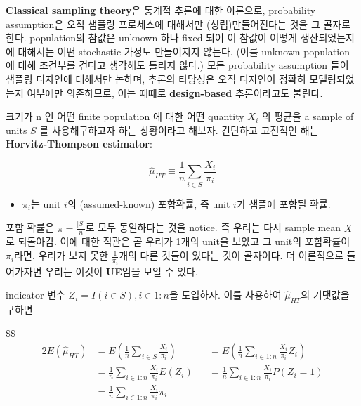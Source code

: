 \documentclass[
]{book}
\providecommand{\tightlist}{%
  \setlength{\itemsep}{0pt}\setlength{\parskip}{0pt}}
\begin{document}
{{{\textbf{Classical sampling theory}은 통계적 추론에 대한 이론으로, probability assumption은 오직 샘플링 프로세스에 대해서만 (성립)만들어진다는 것을 그 골자로 한다. population의 참값은 unknown 하나 fixed 되어 이 참값이 어떻게 생산되었는지에 대해서는 어떤 stochastic 가정도 만들어지지 않는다. (이를 unknown population 에 대해 조건부를 건다고 생각해도 틀리지 않다.) 모든 probability assumption 들이 샘플링 디자인에 대해서만 논하며, 추론의 타당성은 오직 디자인이 정확히 모델링되었는지 여부에만 의존하므로, 이는 때때로 \textbf{design-based} 추론이라고도 불린다.

크기가 n 인 어떤 finite population 에 대한 어떤 quantity \(X_i\) 의 평균을 a sample of units \(S\) 를 사용해구하고자 하는 상황이라고 해보자. 간단하고 고전적인 해는 \textbf{Horvitz-Thompson estimator}:

\[
\hat \mu_{HT} \equiv \frac{1}{n} \sum_{i \in S}\frac{X_i}{\pi_i}
\]

\begin{itemize}
\tightlist
\item
  \(\pi_i\)는 unit \(i\)의 (assumed-known) 포함확률, 즉 unit \(i\)가 샘플에 포함될 확률.
\end{itemize}

포함 확률은 \(\pi = \frac{|S|}{n}\)로 모두 동일하다는 것을 notice. 즉 우리는 다시 sample mean \(X\)로 되돌아감. 이에 대한 직관은 곧 우리가 1개의 unit을 보았고 그 unit의 포함확률이 \(\pi_i\)라면, 우리가 보지 못한 \(\frac{1}{\pi_i}\)개의 다른 것들이 있다는 것이 골자이다. 더 이론적으로 들어가자면 우리는 이것이 \textbf{UE}임을 보일 수 있다.

indicator 변수 \(Z_i = I(i \in S), i \in 1:n\)을 도입하자. 이를 사용하여 \(\hat \mu_{HT}\)의 기댓값을 구하면

\$\$
\begin{alignat}{2}

E \left( \hat \mu_{HT} \right)


&= E \left(\frac{1}{n} \sum_{i \in S} \frac{X_i}{\pi_i} \right)

&&= E \left(\frac{1}{n} \sum_{i \in 1:n} \frac{X_i}{\pi_i} Z_i \right)

\\

&= \frac{1}{n} \sum_{i \in 1:n} \frac{X_i}{\pi_i} E \left( Z_i \right)

&&= \frac{1}{n} \sum_{i \in 1:n} \frac{X_i}{\pi_i} P \left( Z_i =1 \right)

\\

&= \frac{1}{n} \sum_{i \in 1:n} \frac{X_i}{\pi_i} \pi_i


\end{alignat}}}}
\end{document}

